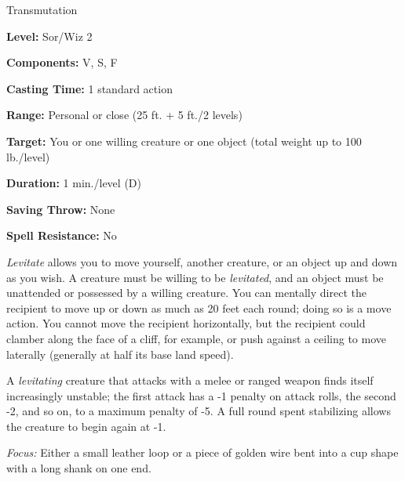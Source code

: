 
Transmutation

\textbf{Level:} Sor/Wiz 2

\textbf{Components:} V, S, F

\textbf{Casting Time:} 1 standard action

\textbf{Range:} Personal or close (25 ft. + 5 ft./2 levels)

\textbf{Target:} You or one willing creature or one object (total weight up to 
100 lb./level)

\textbf{Duration:} 1 min./level (D)

\textbf{Saving Throw:} None

\textbf{Spell Resistance:} No

\textit{Levitate} allows you to move yourself, another creature, or an object up 
and down as you wish. A creature must be willing to be \textit{levitated}, and 
an object must be unattended or possessed by a willing creature. You can mentally 
direct the recipient to move up or down as much as 20 feet each round; doing so 
is a move action. You cannot move the recipient horizontally, but the recipient 
could clamber along the face of a cliff, for example, or push against a ceiling 
to move laterally (generally at half its base land speed).

A \textit{levitating} creature that attacks with a melee or ranged weapon finds 
itself increasingly unstable; the first attack has a -1 penalty on attack rolls, 
the second -2, and so on, to a maximum penalty of -5. A full round spent stabilizing 
allows the creature to begin again at -1.

\textit{Focus:} Either a small leather loop or a piece of golden wire bent into 
a cup shape with a long shank on one end.

